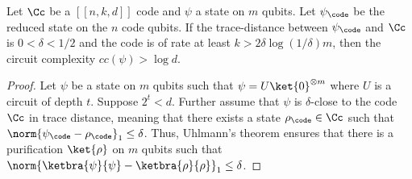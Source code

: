 \documentclass{toc}
\begin{document}
%

\begin{lemma}
\label{lem:warmup-lemma}
Let $\Cc$ be a $[[n,k,d]]$ code and $\psi$ a state on $m$ qubits. Let $\psi_\code$ be the reduced state on the $n$ code qubits. If the trace-distance between $\psi_\code$ and $\Cc$ is $0 < \delta < 1/2$ and the code is of rate at least $k > 2 \delta \log(1/\delta) m$,
then the circuit complexity $cc(\psi) > \log d$.
\end{lemma}

\begin{proof}
Let $\psi$ be a state on $m$ qubits such that $\psi = U \ket{0}^{\otimes m}$ where $U$ is a circuit of depth $t$. Suppose $2^t<d$. Further assume that $\psi$ is $\delta$-close to the code $\Cc$ in trace distance, meaning that there exists a state $\rho_\code \in \Cc$ such that $\norm{\psi_{\code} - \rho_\code}_1 \leq \delta$. Thus, Uhlmann's theorem \cite{uhlmann76} ensures that there is a purification $\ket{\rho}$ on $m$ qubits such that $\norm{\ketbra{\psi}{\psi} - \ketbra{\rho}{\rho}}_1 \leq \delta$.



\end{proof}
\end{document}
